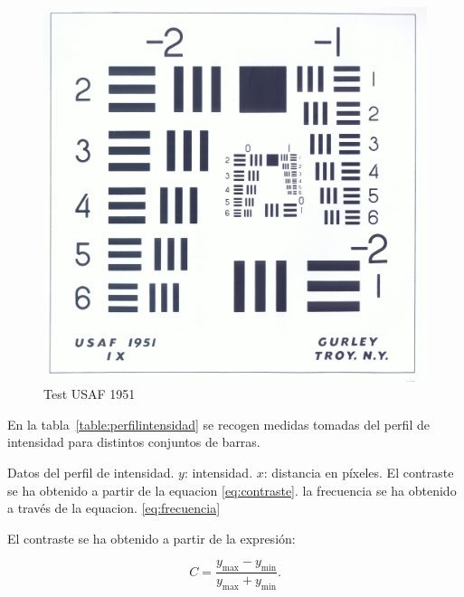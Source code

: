 \documentclass{./packages/optica-article}
\begin{document}
\begin{figure}[htb]
	\centering
	\includegraphics[scale=0.05]{testusaf1951}
	\caption{Test USAF 1951}\label{fig:usaf1951}
\end{figure}

En la tabla~\ref{table:perfilintensidad} se recogen medidas tomadas del perfil de intensidad para distintos conjuntos de barras.

\begin{table}[p]
	\centering
	\caption{Datos del perfil de intensidad. $y$: intensidad. $x$: distancia en píxeles. El contraste se ha obtenido a partir de la equacion \ref{eq:contraste}. la frecuencia se ha obtenido a través de la equacion. \ref{eq:frecuencia}}%
	\label{table:perfilintensidad}
\end{table}

El contraste se ha obtenido a partir de la expresión: 
\nopagebreak

\begin{equation}
	C = \frac{y_{\max} - y_{\min}}{y_{\max} + y_{\min}}.
	\label{eq:contraste}
\end{equation}
\end{document}
